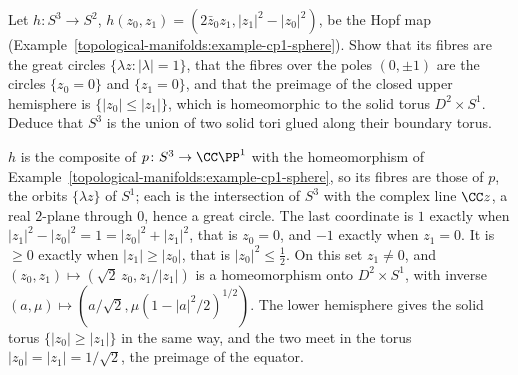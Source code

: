 \begin{exercise}\label{topological-manifolds:exercise-hopf-tori}
Let $h \colon S^3 \to S^2$, $h(z_0, z_1) = (2\bar z_0z_1, |z_1|^2 - |z_0|^2)$, be the Hopf map (Example~\ref{topological-manifolds:example-cp1-sphere}). Show that its fibres are the great circles
$\{\lambda z : |\lambda| = 1\}$, that the fibres over the poles $(0, \pm1)$ are the circles $\{z_0 = 0\}$ and $\{z_1 = 0\}$, and that the preimage of the closed upper hemisphere is $\{|z_0| \leq |z_1|\}$, which is
homeomorphic to the solid torus $D^2 \times S^1$. Deduce that $S^3$ is the union of two solid tori glued along their boundary torus.
\end{exercise}

\begin{solution}
$h$ is the composite of $p \colon S^3 \to \CC\PP^1$ with the homeomorphism of Example~\ref{topological-manifolds:example-cp1-sphere}, so its fibres are those of $p$, the orbits $\{\lambda z\}$ of $S^1$; each is
the intersection of $S^3$ with the complex line $\CC z$, a real $2$-plane through $0$, hence a great circle. The last coordinate is $1$ exactly when $|z_1|^2 - |z_0|^2 = 1 = |z_0|^2 + |z_1|^2$, that is
$z_0 = 0$, and $-1$ exactly when $z_1 = 0$. It is $\geq 0$ exactly when $|z_1| \geq |z_0|$, that is $|z_0|^2 \leq \frac12$. On this set $z_1 \neq 0$, and
$(z_0, z_1) \mapsto (\sqrt2\,z_0, z_1/|z_1|)$ is a homeomorphism onto $D^2 \times S^1$, with inverse $(a, \mu) \mapsto (a/\sqrt2, \mu(1 - |a|^2/2)^{1/2})$. The lower hemisphere gives the solid torus $\{|z_0| \geq |z_1|\}$ in the
same way, and the two meet in the torus $|z_0| = |z_1| = 1/\sqrt2$, the preimage of the equator.
\end{solution}

